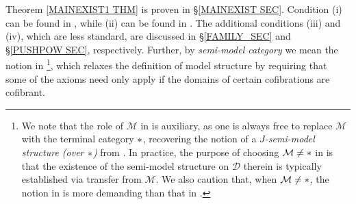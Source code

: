 \documentclass[a4paper,10pt
,draft
]{article}%
\numberwithin{equation}{section}
\numberwithin{figure}{section}
\theoremstyle{definition} %
\newcommand{\Sym}{\ensuremath{\mathsf{Sym}}}%
\newcommand{\V}{\ensuremath{\mathcal V}}
\newcommand{\1}{\ensuremath{\mathbbm 1}}%
\begin{document}
Theorem \ref{MAINEXIST1 THM}
is proven in \S \ref{MAINEXIST SEC}.
Condition (i) can be found in 
\cite[Def. 2.1.17]{Ho98},
while (ii) can be found in \cite[Def. 4.2.6]{Ho98}.
The additional conditions (iii) and (iv),
which are less standard, are discussed in 
\S \ref{FAMILY_SEC} and
\S \ref{PUSHPOW SEC}, respectively.
%
Further, by \textit{semi-model category}
we mean the notion in 
\cite[Def. 2.2.1]{WY18}\footnote{
  We note that the role of $\mathcal M$ in \cite[Def. 2.2.1]{WY18}
  is auxiliary,
  as one is always free to replace $\mathcal M$ 
  with the terminal category $\**$, 
  recovering the notion of a \textit{$J$-semi-model structure (over $\**$)} from \cite[Def. 1]{Spi01}.
  In practice,
  the purpose of choosing $\mathcal{M} \neq \**$
  in \cite{WY18}
  is that the existence of the
  semi-model structure on $\mathcal D$ therein
  is typically established via transfer from $\mathcal{M}$.
  We also caution that, when $\mathcal{M} \neq \**$,
  the notion in \cite{Spi01}
  is more demanding than that in \cite{WY18}.
},
which relaxes the definition of model structure by requiring that some of the axioms need only apply
if the domains of certain cofibrations are cofibrant. 



\end{document}
